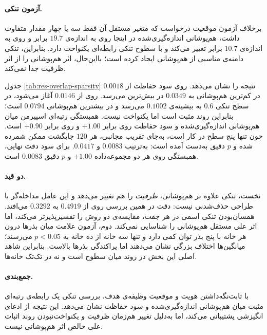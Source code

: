 \paragraph{آزمون تنکی.} برخلاف آزمون موقعیت درخواست که متغیر مستقل آن فقط سه یا چهار مقدار متفاوت داشت، هم‌پوشانی اندازه‌گیری‌شده در اینجا روی  به اندازه‌ی $19.7$ برابر و روی  به اندازه‌ی $10.7$ برابر تغییر می‌کند و با سطوح تنکی رابطه‌ای یکنواخت دارد. بنابراین، تنکی دامنه‌ی مناسبی از هم‌پوشانی ایجاد کرده است؛ بااین‌حال، اثر هم‌پوشانی را از اثر ظرفیت جدا نمی‌کند.



جدول \ref{tab:res-overlap-sparsity} نتیجه را نشان می‌دهد. روی  سود حفاظت از $0.0018$ در کم‌ترین هم‌پوشانی به $0.0349$ در بیش‌ترین می‌رسد. روی  از $0.0146$ آغاز می‌شود، در سطح تنکی $0.6$ به بیشینه‌ی $0.1002$ می‌رسد و در بیشترین هم‌پوشانی $0.0794$ است؛ بنابراین روند مثبت است اما یکنواخت نیست. همبستگی رتبه‌ای اسپیرمن میان هم‌پوشانی اندازه‌گیری‌شده و سود حفاظت روی  برابر $+1.00$ و روی  برابر $+0.90$ است. چون تنها پنج سطح در کار است، به‌جای تقریب مجانبی، هر $120$ جایگشت ممکن شمرده شده و $p$ دقیق به‌دست آمده است: به‌ترتیب $0.0083$ و $0.0417$. برای سود دقت نهایی، همبستگی روی هر دو مجموعه‌داده $+1.00$ و $p$ دقیق $0.0083$ است.

\paragraph{دو قید.} نخست، تنکی علاوه بر هم‌پوشانی، \emph{ظرفیت} را هم تغییر می‌دهد و این عامل مداخله‌گر با طراحی حذف‌شدنی نیست: دقت  در همین بررسی روی  از $0.4919$ به $0.3292$ می‌افتد. همسان‌بودن تنکی اسمی در هر جفت، مقایسه‌ی دو روش را تفسیرپذیرتر می‌کند، اما اثر علی مستقل هم‌پوشانی را شناسایی نمی‌کند. دوم، آزمون علامت میان بذرها درون هر خانه با پنج بذر توان کمی دارد و تنها سه خانه از ده خانه به $p<0.05$ می‌رسند؛ میانگین‌ها اختلاف بزرگی نشان می‌دهند اما پراکندگی بذرها بالاست. بنابراین شاهد اصلی این بخش در روند میان سطوح است و نه در تک‌تک خانه‌ها.

\paragraph{جمع‌بندی.} با ثابت‌نگه‌داشتن هویت و موقعیت وظیفه‌ی هدف، بررسی تنکی یک رابطه‌ی رتبه‌ای مثبت میان هم‌پوشانی اندازه‌گیری‌شده و سود حفاظت نشان می‌دهد. این نتیجه از ادعای انگیزشی  پشتیبانی می‌کند، اما به‌دلیل تغییر هم‌زمان ظرفیت و یکنواخت‌نبودن روند  اثبات علی خالص اثر هم‌پوشانی نیست.

